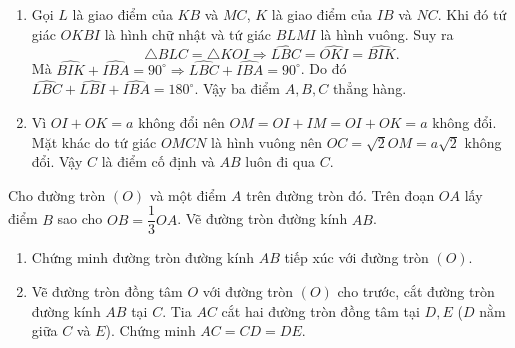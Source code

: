 \begin{bt}
{\begin{enumerate}
Mặt khác, $OI=OK$, $OK=IM$, suy ra $OM=ON$, do đó tứ giác $OMCN$ là hình vuông.
\item Gọi $L$ là giao điểm của $KB$ và $MC$, $K$ là giao điểm của $IB$ và $NC$. Khi đó tứ giác $OKBI$ là hình chữ nhật và tứ giác $BLMI$ là hình vuông. Suy ra \[\triangle BLC=\triangle KOI\Rightarrow \widehat{LBC}=\widehat{OKI}=\widehat{BIK}.\]
Mà $\widehat{BIK}+\widehat{IBA}=90^\circ \Rightarrow \widehat{LBC}+\widehat{IBA}=90^\circ$. Do đó $\widehat{LBC}+\widehat{LBI}+\widehat{IBA}=180^\circ$. Vậy ba điểm $A,B,C$ thẳng hàng.
\item Vì $OI+OK=a$ không đổi nên $OM=OI+IM=OI+OK=a$ không đổi. \\
Mặt khác do tứ giác $OMCN$ là hình vuông nên $OC=\sqrt{2}OM=a\sqrt{2}$ không đổi. Vậy $C$ là điểm cố định và $AB$ luôn đi qua $C$.
\end{enumerate}
}
\end{bt}

\begin{bt}
 Cho đường tròn $(O)$ và một điểm $A$ trên đường tròn đó. Trên đoạn $OA$ lấy điểm $B$ sao cho $OB=\dfrac{1}{3}OA$. Vẽ đường tròn đường kính $AB$.
\begin{enumerate}
\item Chứng minh đường tròn đường kính $AB$ tiếp xúc với đường tròn $(O)$.
\item Vẽ đường tròn đồng tâm $O$ với đường tròn $(O)$ cho trước, cắt đường tròn đường kính $AB$ tại $C$. Tia $AC$ cắt hai đường tròn đồng tâm tại $D,E$ ($D$ nằm giữa $C$ và $E$). Chứng minh $AC=CD=DE$.
\end{enumerate}
\end{bt}

